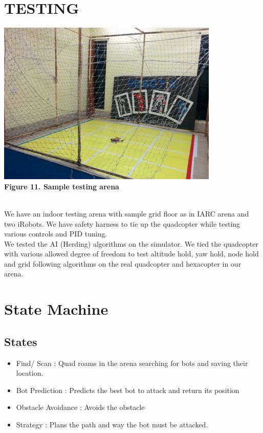 \documentclass[12pt]{article}
\begin{document}
\begin{itemize}
\section{TESTING}
\begin{center}\includegraphics[scale=0.7]{ARK-lab-kgp1} \\
\textbf{Figure 11. Sample testing arena}\end{center}\\
We have an indoor testing arena with sample grid floor as in IARC arena and two iRobots. We have safety harness to 
tie up the quadcopter while testing various controls and PID tuning. \\
We tested the AI (Herding) algorithms on the simulator. We tied the quadcopter with various allowed degree of 
freedom to test altitude hold, yaw hold, node hold and grid following algorithms on the real quadcopter and hexacopter in our arena.
\section{State Machine}
\subsection{States}
\begin{itemize}
\item {Find/ Scan : Quad roams in the arena searching for bots and saving their location.}
\item{Bot Prediction : Predicts the best bot to attack and return its position}
\item{Obstacle Avoidance : Avoids the obstacle}
\item{Strategy : Plans the path and way the bot must be attacked.}
\end{itemize}

\end{itemize}
\end{document}
